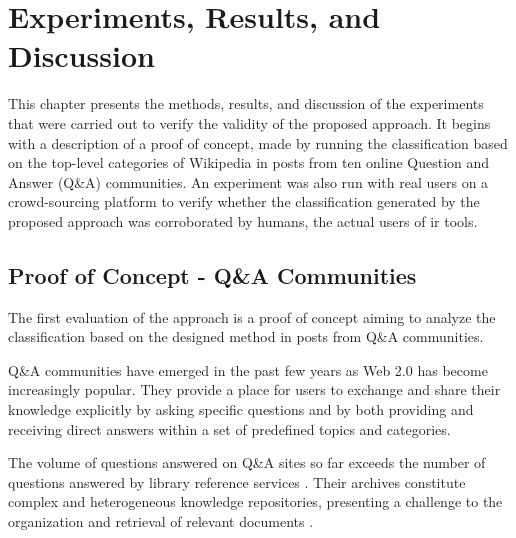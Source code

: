 \chapter{\hspace*{3pt} Experiments, Results, and Discussion}

\label{chapter:experiments}

This chapter presents the methods, results, and discussion of the experiments that were carried out to verify the validity of the proposed approach. It begins with a description of a proof of concept, made by running the classification based on the top-level categories of Wikipedia in posts from ten online Question and Answer (Q\&A) communities.  An experiment was also run with real users on a crowd-sourcing platform to verify whether the classification generated by the proposed approach was corroborated by humans, the actual users of \gls{ir} tools.




\section{\hspace*{3pt} Proof of Concept - Q\&A Communities}
\label{section:proof-of-concept}

The first evaluation of the approach is a proof of concept aiming to analyze the classification based on the designed method in posts from  Q\&A %
communities. 

Q\&A communities have emerged in the past few years as Web 2.0 has become increasingly popular. They provide a place for users to %
exchange and share their knowledge explicitly by asking specific questions and by both providing and receiving direct answers within a set of predefined topics and categories. 

The volume of questions answered on Q\&A sites so far exceeds the number of questions answered by library reference services \cite{Shah:2010}. Their archives constitute complex and heterogeneous knowledge repositories, presenting a challenge to the organization and retrieval of relevant documents \cite{Andrzejewski:2009}.


